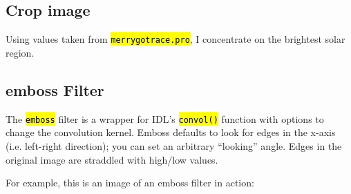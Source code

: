 \documentclass[10pt]{scrartcl}
\begin{document}
    \subsection{Crop image} %
    \label{sub:crop_image}
    Using values taken from \hl{\texttt{merrygotrace.pro}}, I concentrate on the brightest solar region.

    \subsection{emboss Filter}
    \label{sub:emboss_filter}
    The \hl{\texttt{emboss}} filter is a wrapper for IDL's \hl{\texttt{convol()}} function with options to change the convolution kernel. Emboss defaults to look for edges in the x-axis (i.e. left-right direction); you can set an arbitrary ``looking'' angle. Edges in the original image are straddled with high/low values. 

    For example, this is an image of an emboss filter in action:

\begin{figure}[!ht]
\end{figure}
\end{document}
